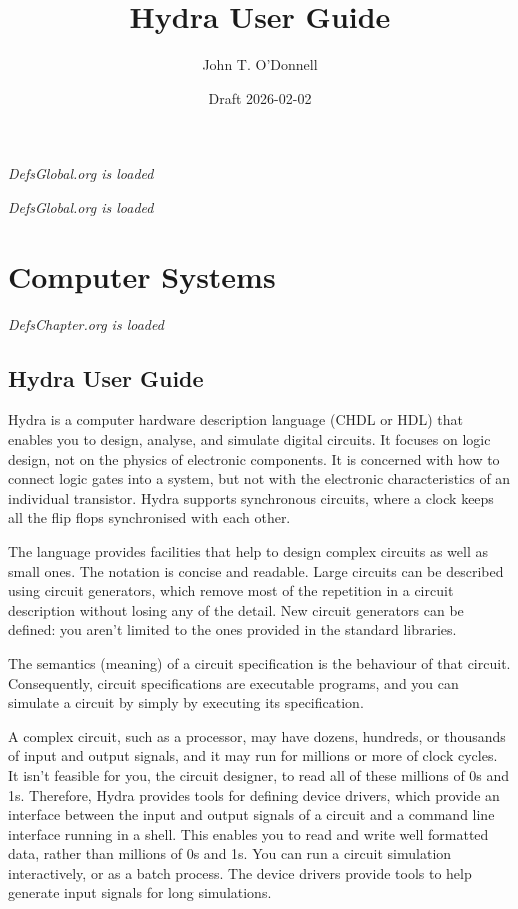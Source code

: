 \documentclass[]{svmono}
\author{John T. O'Donnell}
\date{Draft 2026-02-02}
\title{Hydra User Guide}
\begin{document}
\maketitle
\emph{DefsGlobal.org is loaded}
\setcounter{tocdepth}{6}
\tableofcontents

\setlength\evensidemargin{25pt}
\setlength\oddsidemargin{25pt}




\emph{DefsGlobal.org is loaded}
\part*{Computer Systems}
\label{sec:org3d45a45}

\emph{DefsChapter.org is loaded}
\chapter*{Hydra User Guide}
\label{sec:orgc27805b}

Hydra is a computer hardware description language (CHDL or HDL)
that enables you to design, analyse, and simulate digital
circuits.  It focuses on logic design, not on the physics of
electronic components.  It is concerned with how to connect logic
gates into a system, but not with the electronic characteristics
of an individual transistor.  Hydra supports synchronous circuits,
where a clock keeps all the flip flops synchronised with each
other.

The language provides facilities that help to design complex
circuits as well as small ones. The notation is concise and
readable.  Large circuits can be described using circuit
generators, which remove most of the repetition in a circuit
description without losing any of the detail.  New circuit
generators can be defined: you aren't limited to the ones provided
in the standard libraries.

The semantics (meaning) of a circuit specification is the
behaviour of that circuit.  Consequently, circuit specifications
are executable programs, and you can simulate a circuit by simply
by executing its specification.

A complex circuit, such as a processor, may have dozens, hundreds,
or thousands of input and output signals, and it may run for
millions or more of clock cycles.  It isn't feasible for you, the
circuit designer, to read all of these millions of 0s and 1s.
Therefore, Hydra provides tools for defining device drivers, which
provide an interface between the input and output signals of a
circuit and a command line interface running in a shell.  This
enables you to read and write well formatted data, rather than
millions of 0s and 1s.  You can run a circuit simulation
interactively, or as a batch process.  The device drivers provide
tools to help generate input signals for long simulations.
\end{document}
